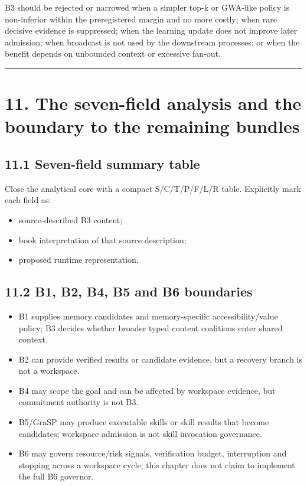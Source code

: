B3 should be rejected or narrowed when a simpler top-k or GWA-like policy is non-inferior within the preregistered margin and no more costly; when rare decisive evidence is suppressed; when the learning update does not improve later admission; when broadcast is not used by the downstream processes; or when the benefit depends on unbounded context or excessive fan-out.

\begin{center}\rule{0.5\linewidth}{0.5pt}\end{center}

\section{11. The seven-field analysis and the boundary to the remaining bundles}\label{11-the-seven-field-analysis-and-the-boundary-to-the-remaining-bundles}

\subsection{11.1 Seven-field summary table}\label{111-seven-field-summary-table}

Close the analytical core with a compact S/C/T/P/F/L/R table. Explicitly mark each field as:

\begin{itemize}
\tightlist
\item
  source-described B3 content;
\item
  book interpretation of that source description;
\item
  proposed runtime representation.
\end{itemize}

\subsection{11.2 B1, B2, B4, B5 and B6 boundaries}\label{112-b1-b2-b4-b5-and-b6-boundaries}

\begin{itemize}
\tightlist
\item
  B1 supplies memory candidates and memory-specific accessibility/value policy; B3 decides whether broader typed content coalitions enter shared context.
\item
  B2 can provide verified results or candidate evidence, but a recovery branch is not a workspace.
\item
  B4 may scope the goal and can be affected by workspace evidence, but commitment authority is not B3.
\item
  B5/GraSP may produce executable skills or skill results that become candidates; workspace admission is not skill invocation governance.
\item
  B6 may govern resource/risk signals, verification budget, interruption and stopping across a workspace cycle; this chapter does not claim to implement the full B6 governor.
\end{itemize}

